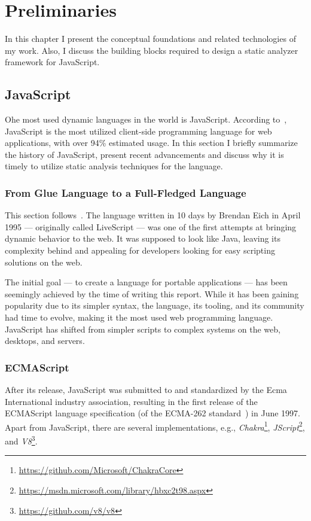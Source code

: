 \chapter{Preliminaries}
\label{chap:preliminaries}

In this chapter I present the conceptual foundations and related technologies of my work. Also, I discuss the building blocks required to design a static analyzer framework for JavaScript.

\section{JavaScript}
Ohe most used dynamic languages in the world is JavaScript. According to~\cite{js-usage}, JavaScript is the most utilized client-side programming language for web applications, with over 94\% estimated usage. In this section I briefly summarize the history of JavaScript, present recent advancements and discuss why it is timely to utilize static analysis techniques for the language.

\subsection{From Glue Language to a Full-Fledged Language}
This section follows~\cite{10.1109/MC.2012.57}. The language written in 10 days by Brendan Eich in April 1995 --- originally called LiveScript --- was one of the first attempts at bringing dynamic behavior to the web. It was supposed to look like Java, leaving its complexity behind and appealing for developers looking for easy scripting solutions on the web.

The initial goal --- to create a language for portable applications --- has been seemingly achieved by the time of writing this report. While it has been gaining popularity due to its simpler syntax, the language, its tooling, and its community had time to evolve, making it the most used web programming language. JavaScript has shifted from simpler scripts to complex systems on the web, desktops, and servers.

\subsection{ECMAScript}
\label{sect:ecmascript}
After its release, JavaScript was submitted to and standardized by the Ecma International industry association, resulting in the first release of the ECMAScript language specification (of the ECMA-262 standard~\cite{ecma-262}) in June 1997. Apart from JavaScript, there are several implementations, e.g., \emph{Chakra}\footnote{\small\url{https://github.com/Microsoft/ChakraCore}}, \emph{JScript}\footnote{\small\url{https://msdn.microsoft.com/library/hbxc2t98.aspx}}, and \emph{V8}\footnote{\small\url{https://github.com/v8/v8}}.

